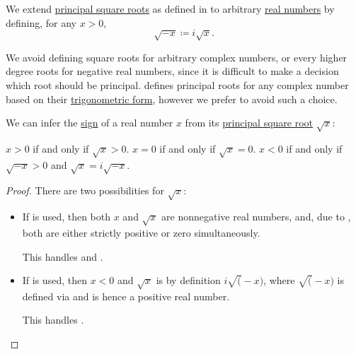 \begin{definition}\label{def:principal_real_square_root}\mimprovised
  We extend \hyperref[def:nth_root]{principal square roots} as defined in  to arbitrary \hyperref[def:real_numbers]{real numbers} by defining, for any \( x > 0 \),
  \begin{equation}\label{eq:def:principal_real_square_root/negative}
    \sqrt {-x} \coloneqq i \sqrt x.
  \end{equation}
\end{definition}
\begin{comments}
  \item We avoid defining square roots for arbitrary complex numbers, or every higher degree roots for negative real numbers, since it is difficult to make a decision which root should be principal.  defines principal roots for any complex number based on their \hyperref[def:complex_numbers_trigonometric_form]{trigonometric form}, however we prefer to avoid such a choice.
\end{comments}

\begin{proposition}\label{thm:principal_real_square_root_sign}
  We can infer the \hyperref[def:signum]{sign} of a real number \( x \) from its \hyperref[def:principal_real_square_root]{principal square root} \( \sqrt x \):
  \begin{thmenum}
     \( x > 0 \) if and only if \( \sqrt x > 0 \).
     \( x = 0 \) if and only if \( \sqrt x = 0 \).
     \( x < 0 \) if and only if \( \sqrt{-x} > 0 \) and \( \sqrt x = i \sqrt{-x} \).
  \end{thmenum}
\end{proposition}
\begin{proof}
  There are two possibilities for \( \sqrt x \):
  \begin{itemize}
    \item If  is used, then both \( x \) and \( \sqrt x \) are nonnegative real numbers, and, due to , both are either strictly positive or zero simultaneously.

    This handles  and .

    \item If  is used, then \( x < 0 \) and \( \sqrt x \) is by definition \( i \sqrt (-x) \), where \( \sqrt (-x) \) is defined via  and is hence a positive real number.

    This handles .
  \end{itemize}
\end{proof}


